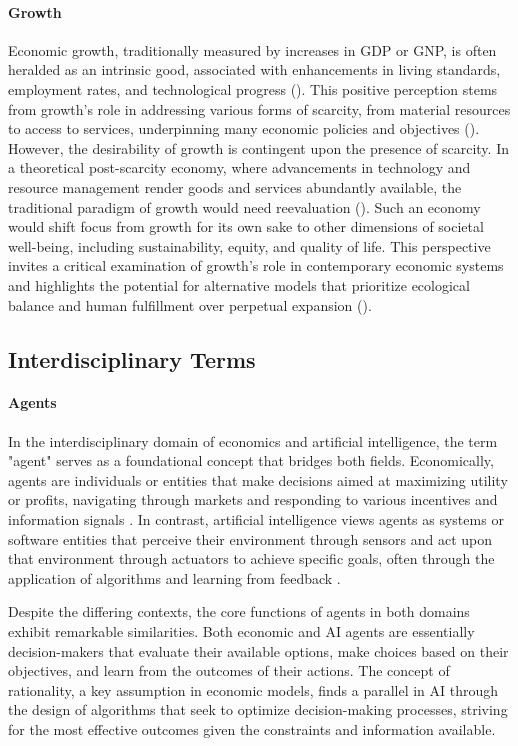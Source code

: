 \documentclass{article}
\begin{document}
\paragraph{Growth}
Economic growth, traditionally measured by increases in GDP or GNP, is often heralded as an intrinsic good, associated with enhancements in living standards, employment rates, and technological progress (\cite{textbookGrowth}). This positive perception stems from growth's role in addressing various forms of scarcity, from material resources to access to services, underpinning many economic policies and objectives (\cite{meadowsLimits}). However, the desirability of growth is contingent upon the presence of scarcity. In a theoretical post-scarcity economy, where advancements in technology and resource management render goods and services abundantly available, the traditional paradigm of growth would need reevaluation (\cite{bookchinPostScarcity}). Such an economy would shift focus from growth for its own sake to other dimensions of societal well-being, including sustainability, equity, and quality of life. This perspective invites a critical examination of growth's role in contemporary economic systems and highlights the potential for alternative models that prioritize ecological balance and human fulfillment over perpetual expansion (\cite{degrowthResearch}).


\subsection{Interdisciplinary Terms}

\paragraph{Agents}
In the interdisciplinary domain of economics and artificial intelligence, the term "agent" serves as a foundational concept that bridges both fields. Economically, agents are individuals or entities that make decisions aimed at maximizing utility or profits, navigating through markets and responding to various incentives and information signals \cite{mankiw_principles_2020}. In contrast, artificial intelligence views agents as systems or software entities that perceive their environment through sensors and act upon that environment through actuators to achieve specific goals, often through the application of algorithms and learning from feedback \cite{russell_artificial_2021}.

Despite the differing contexts, the core functions of agents in both domains exhibit remarkable similarities. Both economic and AI agents are essentially decision-makers that evaluate their available options, make choices based on their objectives, and learn from the outcomes of their actions. The concept of rationality, a key assumption in economic models, finds a parallel in AI through the design of algorithms that seek to optimize decision-making processes, striving for the most effective outcomes given the constraints and information available.
\end{document}
